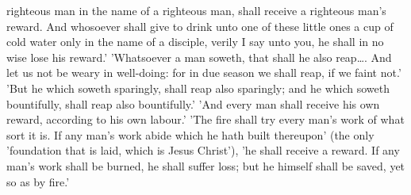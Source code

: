 \documentclass[
]{book}
\begin{document}
righteous man in the name of a righteous man, shall receive a righteous man's reward. And whosoever shall give to drink unto one of these little ones a cup of cold water only in the name of a disciple, verily I say unto you, he shall in no wise lose his reward.' 'Whatsoever a man soweth, that shall he also reap\ldots. And let us not be weary in well-doing: for in due season we shall reap, if we faint not.' 'But he which soweth sparingly, shall reap also sparingly; and he which soweth bountifully, shall reap also bountifully.' 'And every man shall receive his own reward, according to his own labour.' 'The fire shall try every man's work of what sort it is. If any man's work abide which he hath built thereupon' (the only 'foundation that is laid, which is Jesus Christ'), 'he shall receive a reward. If any man's work shall be burned, he shall suffer loss; but he himself shall be saved, yet so as by fire.'
\end{document}
